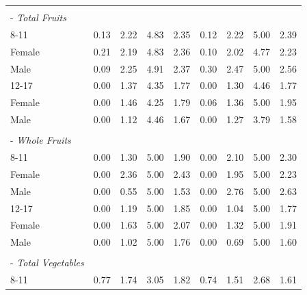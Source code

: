 \documentclass[12pt,leqno,titlepage]{amsart}
\newcommand{\1}{\mathbbm{1}}
\begin{document}
\begin{bibunit}
\begin{longtable}{@{\extracolsep{\fill}}lcccc|cccc@{}}
\rule{0pt}{0.35em} & & & & & & & & \\
\hspace*{0.8em}- \textit{Total Fruits} & & & & & & & & \\
\hspace*{2.2em}8-11 & 0.13 & 2.22 & 4.83 & 2.35 & 0.12 & 2.22 & 5.00 & 2.39 \\
\hspace*{4.4em}Female & 0.21 & 2.19 & 4.83 & 2.36 & 0.10 & 2.02 & 4.77 & 2.23 \\
\hspace*{4.4em}Male & 0.09 & 2.25 & 4.91 & 2.37 & 0.30 & 2.47 & 5.00 & 2.56 \\
\hspace*{2.2em}12-17 & 0.00 & 1.37 & 4.35 & 1.77 & 0.00 & 1.30 & 4.46 & 1.77 \\
\hspace*{4.4em}Female & 0.00 & 1.46 & 4.25 & 1.79 & 0.06 & 1.36 & 5.00 & 1.95 \\
\hspace*{4.4em}Male & 0.00 & 1.12 & 4.46 & 1.67 & 0.00 & 1.27 & 3.79 & 1.58 \\
\rule{0pt}{1.1em} & & & & & & & & \\
\hspace*{0.8em}- \textit{Whole Fruits} & & & & & & & & \\
\hspace*{2.2em}8-11 & 0.00 & 1.30 & 5.00 & 1.90 & 0.00 & 2.10 & 5.00 & 2.30 \\
\hspace*{4.4em}Female & 0.00 & 2.36 & 5.00 & 2.43 & 0.00 & 1.95 & 5.00 & 2.23 \\
\hspace*{4.4em}Male & 0.00 & 0.55 & 5.00 & 1.53 & 0.00 & 2.76 & 5.00 & 2.63 \\
\hspace*{2.2em}12-17 & 0.00 & 1.19 & 5.00 & 1.85 & 0.00 & 1.04 & 5.00 & 1.77 \\
\hspace*{4.4em}Female & 0.00 & 1.63 & 5.00 & 2.07 & 0.00 & 1.32 & 5.00 & 1.91 \\
\hspace*{4.4em}Male & 0.00 & 1.02 & 5.00 & 1.76 & 0.00 & 0.69 & 5.00 & 1.60 \\
\rule{0pt}{1.1em} & & & & & & & & \\
\hspace*{0.8em}- \textit{Total Vegetables} & & & & & & & & \\
\hspace*{2.2em}8-11 & 0.77 & 1.74 & 3.05 & 1.82 & 0.74 & 1.51 & 2.68 & 1.61 \\

\end{longtable}
\end{bibunit}
\end{document}

